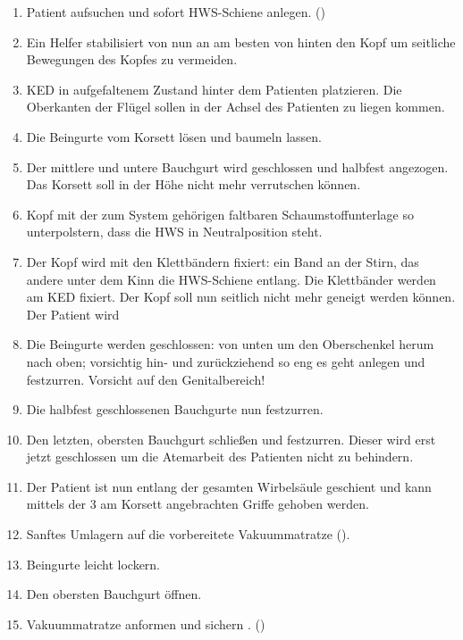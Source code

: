 \begin{enumerate}
    \item Patient aufsuchen und sofort HWS-Schiene anlegen.
    ()
    \item Ein Helfer stabilisiert von nun an am besten von hinten den  Kopf um
    seitliche Bewegungen des Kopfes zu vermeiden.
    \item KED  in aufgefaltenem Zustand
    hinter dem Patienten platzieren. Die Oberkanten der
    Flügel sollen in der Achsel des Patienten zu liegen
    kommen.
    \item Die Beingurte vom Korsett lösen und baumeln
    lassen.
    \item Der mittlere und untere Bauchgurt wird
    geschlossen und halbfest angezogen. Das Korsett soll in der Höhe nicht mehr
    verrutschen können.
    \item Kopf mit der zum System gehörigen faltbaren
    Schaumstoffunterlage so unterpolstern, dass die HWS in
    Neutralposition steht.
    \item Der Kopf wird mit den Klettbändern fixiert: ein
    Band an der Stirn, das andere unter dem Kinn die HWS-Schiene
    entlang. Die Klettbänder werden am KED
    fixiert. Der Kopf soll nun seitlich nicht mehr geneigt
    werden können. Der Patient wird 
    \item Die Beingurte werden geschlossen: von unten um
    den Oberschenkel herum nach oben; vorsichtig hin- und
    zurückziehend so eng es geht anlegen und festzurren.
    Vorsicht auf den Genitalbereich!
    \item Die halbfest geschlossenen Bauchgurte nun
    festzurren.
    \item Den letzten, obersten Bauchgurt schließen und
    festzurren. Dieser wird erst jetzt geschlossen um die
    Atemarbeit des Patienten nicht zu behindern.
    \item Der Patient ist nun entlang der gesamten
    Wirbelsäule geschient und kann mittels der 3 am Korsett
    angebrachten Griffe gehoben werden.
    \item Sanftes Umlagern auf die vorbereitete
    Vakuummatratze ().
    \item Beingurte leicht lockern.
    \item Den obersten Bauchgurt öffnen.
    \item Vakuummatratze anformen und sichern .
    ()
       
\end{enumerate}



